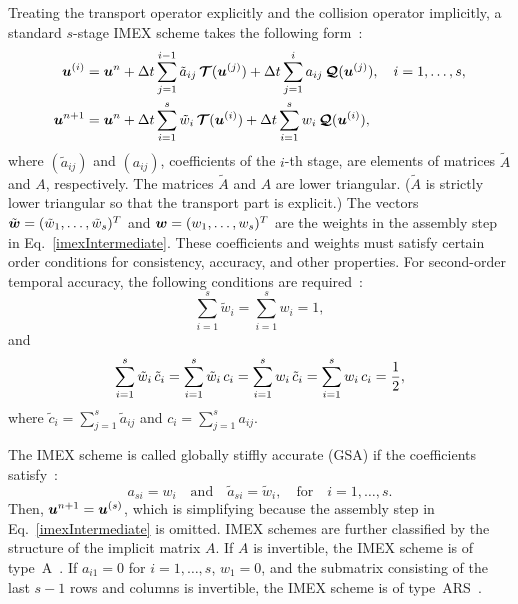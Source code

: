 Treating the transport operator explicitly and the collision operator implicitly, a standard $s$-stage IMEX scheme takes the following form~\cite{pareschiRusso_2005}: 
\begin{align}
  \boldsymbol{u}^{(i)}
  &=\boldsymbol{u}^{n}
  +\Delta t\sum_{j=1}^{i-1}\tilde{a}_{ij}\,\boldsymbol{\mathcal{T}}(\boldsymbol{u}^{(j)})
  +\Delta t\sum_{j=1}^{i}a_{ij}\,\boldsymbol{\mathcal{Q}}(\boldsymbol{u}^{(j)}),
  \quad i=1,\ldots,s, \label{imexStages} \\
  \boldsymbol{u}^{n+1}
  &=\boldsymbol{u}^{n}
  +\Delta t\sum_{i=1}^{s}\tilde{w}_{i}\,\boldsymbol{\mathcal{T}}(\boldsymbol{u}^{(i)})
  +\Delta t\sum_{i=1}^{s}w_{i}\,\boldsymbol{\mathcal{Q}}(\boldsymbol{u}^{(i)}), \label{imexIntermediate} 
\end{align}
where $(\tilde{a}_{ij})$ and $(a_{ij})$, coefficients of the $i$-th stage, are elements of matrices $\tilde{A}$ and $A$, respectively.
The matrices $\tilde{A}$ and $A$ are lower triangular.
($\tilde{A}$ is strictly lower triangular so that the transport part is explicit.)  
The vectors $\tilde{\boldsymbol{w}}=(\tilde{w}_{1},\ldots,\tilde{w}_{s})^{T}$ and $\boldsymbol{w}=(w_{1},\ldots,w_{s})^{T}$ are the weights in the assembly step in Eq.~\eqref{imexIntermediate}.
These coefficients and weights must satisfy certain order conditions for consistency, accuracy, and other properties.  
For second-order temporal accuracy, the following conditions are required~\cite{hairer_1981}:
\begin{equation}
  \sum_{i=1}^{s}\tilde{w}_{i}=\sum_{i=1}^{s}w_{i}=1,
  \label{orderConditions1}
\end{equation}
and
\begin{equation}
  \sum_{i=1}^{s}\tilde{w}_{i}\,\tilde{c}_{i}
  =\sum_{i=1}^{s}\tilde{w}_{i}\,c_{i}
  =\sum_{i=1}^{s}w_{i}\,\tilde{c}_{i}
  =\sum_{i=1}^{s}w_{i}\,c_{i}=\frac{1}{2}, 
  \label{orderConditions2}
\end{equation}
where $\tilde{c}_{i} = \sum_{j=1}^{s}\tilde{a}_{ij}$ and $c_{i}=\sum_{j=1}^{s}a_{ij}$.

The IMEX scheme is called globally stiffly accurate (GSA) if the coefficients satisfy~\cite{dimarcoPareschi2013}:
\begin{equation}
  a_{si}=w_{i} \quad\text{and}\quad \tilde{a}_{si}=\tilde{w}_{i}, \quad \text{for} \quad i=1,\ldots,s.
\end{equation}
Then, $\boldsymbol{u}^{n+1} = \boldsymbol{u}^{(s)}$, which is simplifying because the assembly step in Eq.~\eqref{imexIntermediate} is omitted.  
IMEX schemes are further classified by the structure of the implicit matrix $A$.  
If $A$ is invertible, the IMEX scheme is of type~A~\cite{pareschiRusso_2005}.  
If $a_{i1} = 0$ for $i=1,\ldots,s$, $w_{1} = 0$, and the submatrix consisting of the last $s-1$ rows and columns is invertible, the IMEX scheme is of type~ARS~\cite{ascher_etal_1997,pareschiRusso_2005}.  


